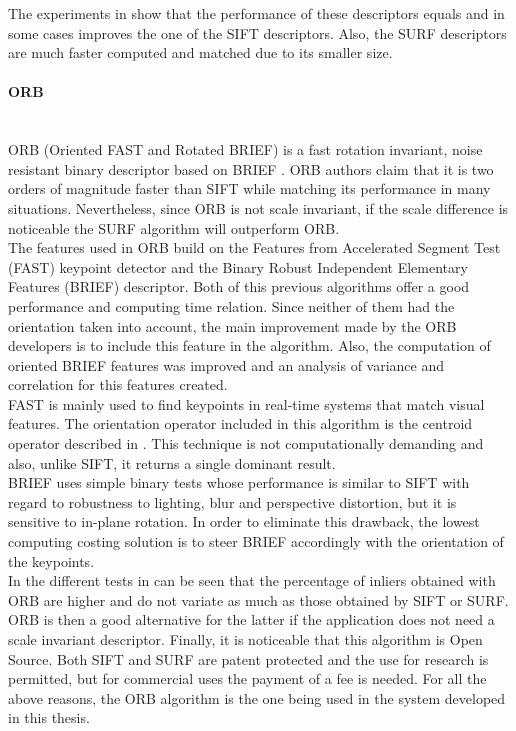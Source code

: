 The experiments in \cite{surf} show that the performance of these descriptors equals and in some cases improves the one of the SIFT descriptors. Also, the SURF descriptors are much faster computed and matched due to its smaller size. 


\paragraph{ORB}\mbox{}\\

ORB (Oriented FAST and Rotated BRIEF) is a fast rotation invariant, noise resistant binary descriptor based on BRIEF \cite{orb}.
ORB authors claim that it is two orders of magnitude faster than SIFT while matching its performance in many situations. 
Nevertheless, since ORB is not scale invariant, if the scale difference is noticeable the SURF algorithm will outperform ORB. 
\\

The features used in ORB build on the Features from Accelerated Segment Test (FAST) \cite{fast} keypoint detector and the Binary Robust Independent Elementary Features (BRIEF) \cite{brief} descriptor. Both of this previous algorithms offer a good performance and computing time relation. Since neither of them had the orientation taken into account, the main improvement made by the ORB developers is to include this feature in the algorithm. Also, the computation of oriented BRIEF features was improved and an analysis of variance and correlation for this features created. 
\\

FAST is mainly used to find keypoints in real-time systems that match visual features. The orientation operator included in this algorithm is the centroid operator described in \cite{orientation_corners}. This technique is not computationally demanding and also, unlike SIFT, it returns a single dominant result. 
\\

BRIEF uses simple binary tests whose performance is similar to SIFT with regard to robustness to lighting, blur and perspective distortion, but it is sensitive to in-plane rotation. In order to eliminate this drawback, the lowest computing costing solution is to steer BRIEF accordingly with the orientation of the keypoints. 
\\

In the different tests in \cite{orb} can be seen that the percentage of inliers obtained with ORB are higher and do not variate as much as those obtained by SIFT or SURF. 
ORB is then a good alternative for the latter if the application does not need a scale invariant descriptor. 
Finally, it is noticeable that this algorithm is Open Source.
Both SIFT and SURF are patent protected and the use for research is permitted, but for commercial uses the payment of a fee is needed. %
For all the above reasons, the ORB algorithm is the one being used in the system developed in this thesis. 
\newpage


